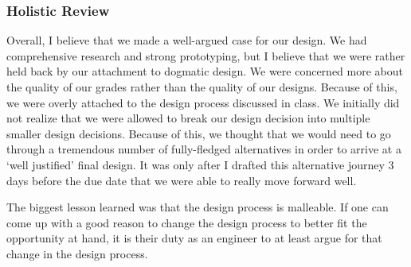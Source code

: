 \documentclass[a4paper,12pt]{article}
\begin{document}
\subsubsection{Holistic Review}
Overall, I believe that we made a well-argued case for our design. We had comprehensive research and strong prototyping, but I believe that we were rather held back by our attachment to dogmatic design. We were concerned more about the quality of our grades rather than the quality of our designs. Because of this, we were overly attached to the design process discussed in class. We initially did not realize that we were allowed to break our design decision into multiple smaller design decisions. Because of this, we thought that we would need to go through a tremendous number of fully-fledged alternatives in order to arrive at a ‘well justified’ final design. It was only after I drafted this alternative journey 3 days before the due date that we were able to really move forward well.

The biggest lesson learned was that the design process is malleable. If one can come up with a good reason to change the design process to better fit the opportunity at hand, it is their duty as an engineer to at least argue for that change in the design process.
\end{document}
